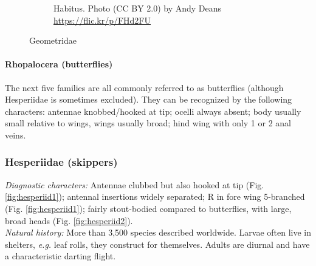 \documentclass[letterpaper, 11pt]{article}
\begin{document}
\begin{figure}[ht!]
\begin{subfigure}[ht!]{0.48\textwidth}
        \caption{Habitus. Photo (CC BY 2.0) by Andy Deans \url{https://flic.kr/p/FHd2FU}}
        \label{fig:geometrid2}
    \end{subfigure}
    \caption{Geometridae}\label{fig:geometrids}
\end{figure}


\FloatBarrier
\paragraph{Rhopalocera (butterflies)} The next five families are all commonly referred to as butterflies (although Hesperiidae is sometimes excluded). They can be recognized by the following characters: antennae knobbed/hooked at tip; ocelli always absent; body usually small relative to wings, wings usually broad; hind wing with only 1 or 2 anal veins.

\subsubsection{Hesperiidae (skippers)}
\noindent{}\textit{Diagnostic characters:} Antennae clubbed but also hooked at tip (Fig. \ref{fig:hesperiid1}); antennal insertions widely separated; R in fore wing 5-branched (Fig. \ref{fig:hesperiid1}); fairly stout-bodied compared to butterflies, with large, broad heads (Fig. \ref{fig:hesperiid2}).\\

\noindent{}\textit{Natural history:} More than 3,500 species described worldwide. Larvae often live in shelters, \textit{e.g.} leaf rolls, they construct for themselves. Adults are diurnal and have a characteristic darting flight.

\end{document}
